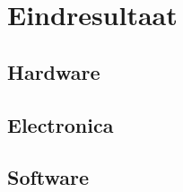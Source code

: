\chapter{Eindresultaat}
\label{Eindresultaat}

\section{Hardware}

\section{Electronica}

\section{Software}


